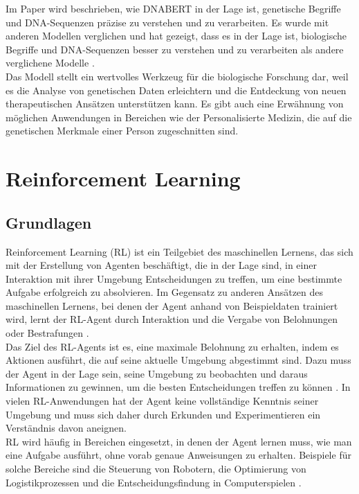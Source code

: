 \documentclass[oneside,bibliography=totocnumbered,BCOR=5mm]{scrbook}%
\theoremstyle{definition}
\theoremstyle{definition}
\theoremstyle{definition}
\theoremstyle{definition}
\theoremstyle{definition}
\theoremstyle{definition}
\begin{document}
Im Paper wird beschrieben, wie DNABERT in der Lage ist, 
genetische Begriffe und DNA-Sequenzen präzise zu verstehen und zu verarbeiten. 
Es wurde mit anderen Modellen verglichen und hat gezeigt, dass es in der Lage ist, 
biologische Begriffe und DNA-Sequenzen besser zu verstehen und zu verarbeiten als andere 
verglichene Modelle \autocite[Seite 2118]{dnabert}. \\


Das Modell stellt ein wertvolles Werkzeug für die biologische Forschung dar, 
weil es die Analyse von genetischen Daten erleichtern und die Entdeckung von neuen therapeutischen Ansätzen unterstützen kann. 
Es gibt auch eine Erwähnung von möglichen Anwendungen in Bereichen wie der Personalisierte Medizin, 
die auf die genetischen Merkmale einer Person zugeschnitten sind. \\

\clearpage

\section{Reinforcement Learning}

\subsection{Grundlagen}
Reinforcement Learning (RL) ist ein Teilgebiet des maschinellen Lernens, 
das sich mit der Erstellung von Agenten beschäftigt, die in der Lage sind, 
in einer Interaktion mit ihrer Umgebung Entscheidungen zu treffen, um eine bestimmte Aufgabe erfolgreich zu absolvieren. 
Im Gegensatz zu anderen Ansätzen des maschinellen Lernens, bei denen der Agent anhand von Beispieldaten trainiert wird, 
lernt der RL-Agent durch Interaktion und die Vergabe von Belohnungen oder Bestrafungen \autocite[Seite 2]{deepRL}. \\


Das Ziel des RL-Agents ist es, eine maximale Belohnung zu erhalten, indem es Aktionen ausführt, 
die auf seine aktuelle Umgebung abgestimmt sind. 
Dazu muss der Agent in der Lage sein, seine Umgebung zu beobachten und daraus Informationen zu gewinnen, 
um die besten Entscheidungen treffen zu können \autocite[Seite 2]{deepRL}. 
In vielen RL-Anwendungen hat der Agent keine vollständige Kenntnis seiner Umgebung und muss sich daher 
durch Erkunden und Experimentieren ein Verständnis davon aneignen. \\


RL wird häufig in Bereichen eingesetzt, in denen der Agent lernen muss, wie man eine Aufgabe ausführt, 
ohne vorab genaue Anweisungen zu erhalten. Beispiele für solche Bereiche sind die Steuerung von Robotern, 
die Optimierung von Logistikprozessen und die Entscheidungsfindung in Computerspielen \autocite[Seite 1]{deepRL}. \\
\end{document}
